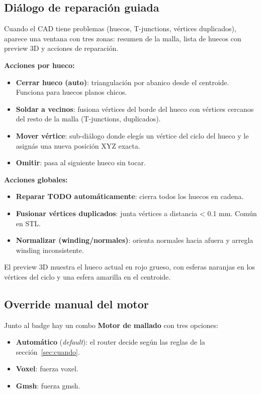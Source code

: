 \documentclass[11pt, a4paper]{article}
\newcommand{\menu}[1]{\textbf{\guillemotleft #1\guillemotright}}
\begin{document}
\subsection{Diálogo de reparación guiada}\label{sec:repair}

Cuando el CAD tiene problemas (huecos, T-junctions, vértices duplicados),
aparece una ventana con tres zonas: resumen de la malla, lista de huecos
con preview 3D y acciones de reparación.

\textbf{Acciones por hueco:}
\begin{itemize}[itemsep=2pt]
  \item \textbf{Cerrar hueco (auto)}: triangulación por abanico desde el
        centroide. Funciona para huecos planos chicos.
  \item \textbf{Soldar a vecinos}: fusiona vértices del borde del hueco con
        vértices cercanos del resto de la malla (T-junctions, duplicados).
  \item \textbf{Mover vértice}: sub-diálogo donde elegís un vértice del
        ciclo del hueco y le asignás una nueva posición XYZ exacta.
  \item \textbf{Omitir}: pasa al siguiente hueco sin tocar.
\end{itemize}

\textbf{Acciones globales:}
\begin{itemize}[itemsep=2pt]
  \item \textbf{Reparar TODO automáticamente}: cierra todos los huecos en
        cadena.
  \item \textbf{Fusionar vértices duplicados}: junta vértices a distancia
        < 0.1 mm. Común en STL.
  \item \textbf{Normalizar (winding/normales)}: orienta normales hacia
        afuera y arregla winding inconsistente.
\end{itemize}

El preview 3D muestra el hueco actual en rojo grueso, con esferas naranjas
en los vértices del ciclo y una esfera amarilla en el centroide.

\subsection{Override manual del motor}

Junto al badge hay un combo \menu{Motor de mallado} con tres opciones:

\begin{itemize}[itemsep=2pt]
  \item \textbf{Automático} (\textit{default}): el router decide según las
        reglas de la sección~\ref{sec:cuando}.
  \item \textbf{Voxel}: fuerza voxel.
  \item \textbf{Gmsh}: fuerza gmsh.
\end{itemize}
\end{document}
